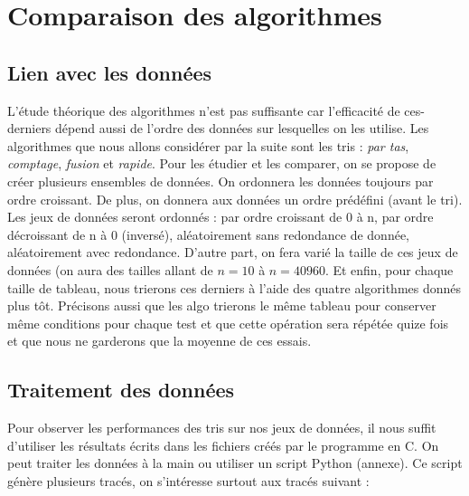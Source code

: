 \documentclass[11pt,a4paper]{article}
\begin{document}
\newpage

\section{Comparaison des algorithmes}
\subsection{Lien avec les données}
L’étude théorique des algorithmes n’est pas suffisante car l’efficacité de ces-derniers dépend
aussi de l’ordre des données sur lesquelles on les utilise. Les algorithmes que nous allons considérer
par la suite sont les tris : \textit{par tas}, \textit{comptage}, \textit{fusion} et \textit{rapide}.
Pour les étudier et les comparer, on se propose de créer plusieurs ensembles de données.
On ordonnera les données toujours par ordre croissant. De plus, on donnera aux données un
ordre prédéfini (avant le tri). Les jeux de données seront ordonnés : par ordre croissant de 0 à n,
par ordre décroissant de n à 0 (inversé), aléatoirement sans redondance de donnée, aléatoirement
avec redondance. D’autre part, on fera varié la taille de ces jeux de données (on
aura des tailles allant de $n = 10$ à $n = 40960$. Et enfin, pour chaque taille de tableau, nous trierons ces derniers
à l'aide des quatre algorithmes donnés plus tôt. Précisons aussi que les algo trierons le même tableau pour conserver
même conditions pour chaque test et que cette opération sera répétée quize fois et que nous ne garderons que la moyenne de ces essais.

\subsection{Traitement des données}
Pour observer les performances des tris sur nos jeux de données, il nous suffit d’utiliser les
résultats écrits dans les fichiers créés par le programme en C. On peut traiter les données à la main
ou utiliser un script Python (annexe). Ce script génère plusieurs tracés, on s’intéresse surtout aux tracés suivant :
\end{document}
